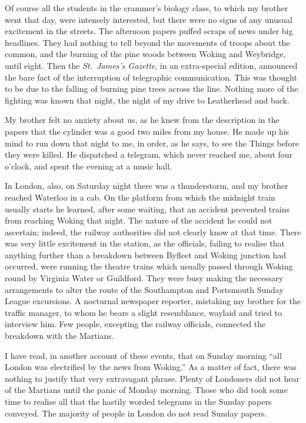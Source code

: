 Of course all the students in the crammer's biology class, to which
my brother went that day, were intensely interested, but there were
no signs of any unusual excitement in the streets. The afternoon
papers puffed scraps of news under big headlines. They had nothing
to tell beyond the movements of troops about the common, and the
burning of the pine woods between Woking and Weybridge, until
eight. Then the \emph{St.\ James's Gazette}, in an extra-special
edition, announced the bare fact of the interruption of telegraphic
communication. This was thought to be due to the falling of burning
pine trees across the line. Nothing more of the fighting was known
that night, the night of my drive to Leatherhead and back.

My brother felt no anxiety about us, as he knew from the
description in the papers that the cylinder was a good two miles
from my house. He made up his mind to run down that night to me, in
order, as he says, to see the Things before they were killed. He
dispatched a telegram, which never reached me, about four o'clock,
and spent the evening at a music hall.

In London, also, on Saturday night there was a thunderstorm, and my
brother reached Waterloo in a cab. On the platform from which the
midnight train usually starts he learned, after some waiting, that
an accident prevented trains from reaching Woking that night. The
nature of the accident he could not ascertain; indeed, the railway
authorities did not clearly know at that time. There was very
little excitement in the station, as the officials, failing to
realise that anything further than a breakdown between Byfleet and
Woking junction had occurred, were running the theatre trains which
usually passed through Woking round by Virginia Water or Guildford.
They were busy making the necessary arrangements to alter the route
of the Southampton and Portsmouth Sunday League excursions. A
nocturnal newspaper reporter, mistaking my brother for the traffic
manager, to whom he bears a slight resemblance, waylaid and tried
to interview him. Few people, excepting the railway officials,
connected the breakdown with the Martians.

I have read, in another account of these events, that on Sunday
morning ``all London was electrified by the news from Woking.'' As a
matter of fact, there was nothing to justify that very extravagant
phrase. Plenty of Londoners did not hear of the Martians until the
panic of Monday morning. Those who did took some time to realise
all that the hastily worded telegrams in the Sunday papers
conveyed. The majority of people in London do not read Sunday
papers.

